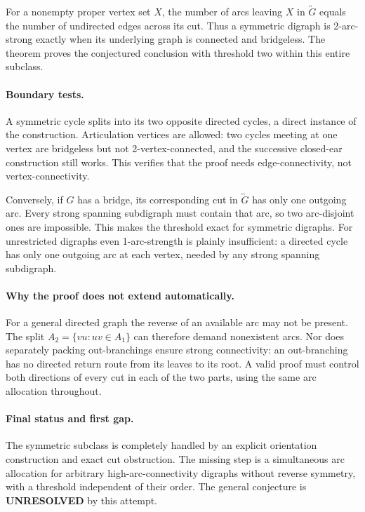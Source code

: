 \documentclass[11pt,a4paper]{article}
\begin{document}
For a nonempty proper vertex set $X$, the number of arcs leaving $X$ in $\overleftrightarrow{G}$ equals the number of undirected edges across its cut. Thus a symmetric digraph is 2-arc-strong exactly when its underlying graph is connected and bridgeless. The theorem proves the conjectured conclusion with threshold two within this entire subclass.

\paragraph{Boundary tests.}
A symmetric cycle splits into its two opposite directed cycles, a direct instance of the construction. Articulation vertices are allowed: two cycles meeting at one vertex are bridgeless but not 2-vertex-connected, and the successive closed-ear construction still works. This verifies that the proof needs edge-connectivity, not vertex-connectivity.

Conversely, if $G$ has a bridge, its corresponding cut in $\overleftrightarrow{G}$ has only one outgoing arc. Every strong spanning subdigraph must contain that arc, so two arc-disjoint ones are impossible. This makes the threshold exact for symmetric digraphs. For unrestricted digraphs even 1-arc-strength is plainly insufficient: a directed cycle has only one outgoing arc at each vertex, needed by any strong spanning subdigraph.

\paragraph{Why the proof does not extend automatically.}
For a general directed graph the reverse of an available arc may not be present. The split $A_2=\{vu:uv\in A_1\}$ can therefore demand nonexistent arcs. Nor does separately packing out-branchings ensure strong connectivity: an out-branching has no directed return route from its leaves to its root. A valid proof must control both directions of every cut in each of the two parts, using the same arc allocation throughout.

\paragraph{Final status and first gap.}
The symmetric subclass is completely handled by an explicit orientation construction and exact cut obstruction. The missing step is a simultaneous arc allocation for arbitrary high-arc-connectivity digraphs without reverse symmetry, with a threshold independent of their order. The general conjecture is \textbf{UNRESOLVED} by this attempt.
\end{document}
